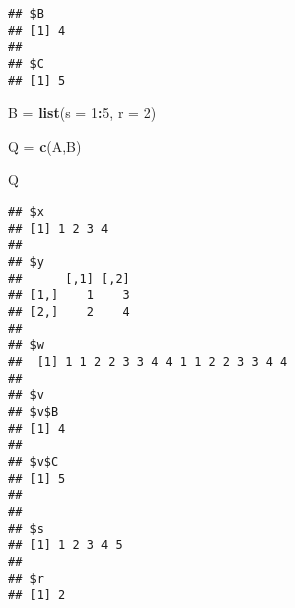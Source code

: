 \documentclass[]{article}
\newenvironment{Shaded}{\begin{snugshade}}{\end{snugshade}}
\newcommand{\KeywordTok}[1]{\textcolor[rgb]{0.13,0.29,0.53}{\textbf{#1}}}
\newcommand{\DataTypeTok}[1]{\textcolor[rgb]{0.13,0.29,0.53}{#1}}
\newcommand{\DecValTok}[1]{\textcolor[rgb]{0.00,0.00,0.81}{#1}}
\newcommand{\StringTok}[1]{\textcolor[rgb]{0.31,0.60,0.02}{#1}}
\newcommand{\OperatorTok}[1]{\textcolor[rgb]{0.81,0.36,0.00}{\textbf{#1}}}
\newcommand{\NormalTok}[1]{#1}
\begin{document}
\begin{verbatim}
## $B
## [1] 4
## 
## $C
## [1] 5
\end{verbatim}

\begin{Shaded}
\begin{Highlighting}[]
\NormalTok{B =}\StringTok{ }\KeywordTok{list}\NormalTok{(}\DataTypeTok{s =} \DecValTok{1}\OperatorTok{:}\DecValTok{5}\NormalTok{, }\DataTypeTok{r =} \DecValTok{2}\NormalTok{)}

\NormalTok{Q =}\StringTok{ }\KeywordTok{c}\NormalTok{(A,B)}

\NormalTok{Q}
\end{Highlighting}
\end{Shaded}

\begin{verbatim}
## $x
## [1] 1 2 3 4
## 
## $y
##      [,1] [,2]
## [1,]    1    3
## [2,]    2    4
## 
## $w
##  [1] 1 1 2 2 3 3 4 4 1 1 2 2 3 3 4 4
## 
## $v
## $v$B
## [1] 4
## 
## $v$C
## [1] 5
## 
## 
## $s
## [1] 1 2 3 4 5
## 
## $r
## [1] 2
\end{verbatim}
\end{document}
